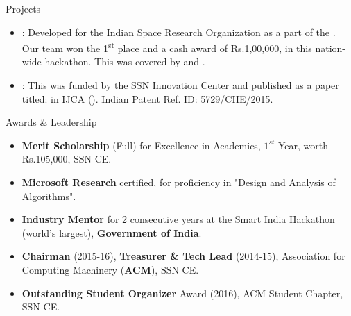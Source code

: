 \documentclass[]{mcdowellcv}
\begin{document}
	\begin{cvsection}{Projects}
		\begin{cvsubsection}{}{}{}
			\begin{itemize}
				\item \textbf{\href{https://www.youtube.com/watch?v=iWw4_Ub2lPw&feature=youtu.be}{\color{blue!70}{Distributed Panorama Construction of High-Resolution UAV Images Using Public Compute Nodes}}}: Developed for the Indian Space Research Organization as a part of the \href{https://www.facebook.com/gtuoffice/videos/1786668221397028/?t=8798}{{\color{blue!70}{Smart India Hackathon 2018}}}. Our team won the 1\textsuperscript{st} place and a cash award of Rs.1,00,000, in this nation-wide hackathon. This was covered by \href{https://www.thehindu.com/todays-paper/tp-national/tp-tamilnadu/5-teams-from-ssn-college-win-prizes/article23461319.ece}{{}} and \href{https://timesofindia.indiatimes.com/city/ahmedabad/six-winners-emerge-from-smart-india-hackathon/articleshow/63561717.cms?utm_source=whatsapp&utm_medium=social&utm_campaign=TOIMobile}{{}}.
				\item \textbf{\href{https://www.youtube.com/watch?v=O-L_uSHqQvQ}{\color{blue!70}{Universally Compatible and Accessible, Software Controlled, Expandable Home Automation System, for Energy Conservation and the Differently-Abled}}}: This \href{https://github.com/tpsatish95/home-automation-system}{\color{blue!70}{research project}} was funded by the SSN Innovation Center and published as a paper titled: \href{http://research.ijcaonline.org/volume116/number11/pxc3902601.pdf}{\color{blue!70}{"Home Automation Systems - A Study"}} in IJCA (\href{https://scholar.google.co.in/citations?user=gNr8v84AAAAJ&hl=en&oi=ao}{\color{blue!70}{cited 35 times}}). Indian Patent Ref. ID: 5729/CHE/2015.
			\end{itemize}
		\end{cvsubsection}
	\end{cvsection}
	
	\begin{cvsection}{Awards \& Leadership}
		\begin{cvsubsection}{}{}{}
			\begin{itemize}
				\item \textbf{Merit Scholarship} (Full) for Excellence in Academics, $1^{st}$ Year, worth Rs.105,000, SSN CE.
                \item \textbf{Microsoft Research} certified, for proficiency in "Design and Analysis of Algorithms".
                \item \textbf{Industry Mentor} for 2 consecutive years at the Smart India Hackathon (world's largest), \textbf{Government of India}.
                \item \textbf{Chairman} (2015-16), \textbf{Treasurer \& Tech Lead} (2014-15), Association for Computing Machinery (\textbf{ACM}), SSN CE.
                \item \textbf{Outstanding Student Organizer} Award (2016), ACM Student Chapter, SSN CE.
			\end{itemize}
		\end{cvsubsection}
	\end{cvsection}
	
\end{document}
